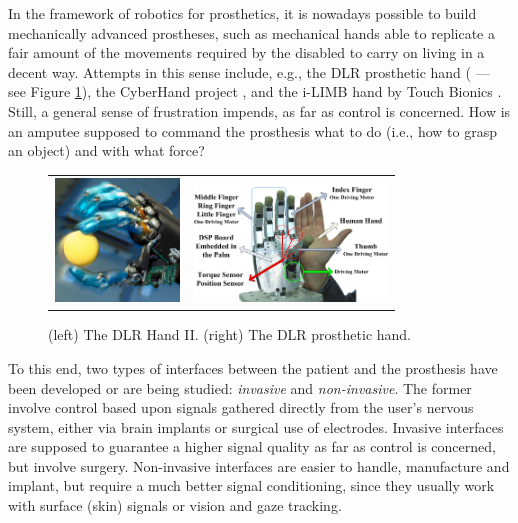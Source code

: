 In the framework of robotics for prosthetics, it is nowadays possible
to build mechanically advanced prostheses, such as mechanical hands
able to replicate a fair amount of the movements required by the
disabled to carry on living in a decent way.  Attempts in this sense
include, e.g., the DLR prosthetic hand (\cite{Hua2006} --- see Figure
\ref{fig:DLRHandII}), the CyberHand project \cite{cyberhand}, and the
i-LIMB hand by Touch Bionics \cite{ilimb}. Still, a general sense of
frustration impends, as far as control is concerned. How is an amputee
supposed to command the prosthesis what to do (i.e., how to grasp an
object) and with what force?

\begin{figure}
  \begin{tabular}{cc}
    \includegraphics[height=3.3cm]{figs/DLRHand-Ball-comp.jpg} &
    \includegraphics[height=3.3cm]{figs/DLR-Prothese.jpg}
  \end{tabular}
  \caption{(left) The DLR Hand II. (right) The DLR prosthetic hand.}
  \label{fig:DLRHandII}
\end{figure}

To this end, two types of interfaces between the patient and the
prosthesis have been developed or are being studied:
\emph{invasive} and \emph{non-invasive}. The former involve
control based upon signals gathered directly from the user's nervous
system, either via brain implants or surgical use of
electrodes. Invasive interfaces are supposed to guarantee a higher
signal quality as far as control is concerned, but involve
surgery. Non-invasive interfaces are easier to handle, manufacture and
implant, but require a much better signal conditioning, since they
usually work with surface (skin) signals or vision and gaze tracking.

